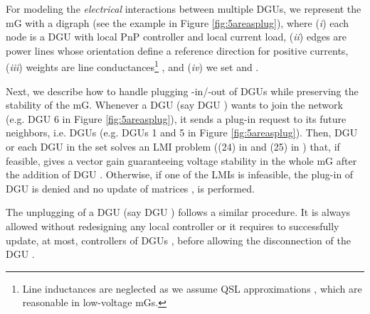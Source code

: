 \documentclass[a4paper]{article}
\theoremstyle{plain}
\begin{document}
For modeling the \textit{electrical} interactions between multiple DGUs, we represent the mG
with a digraph  (see the example in Figure \ref{fig:5areasplug}), where (\textit{i}) each node is a DGU with
local PnP controller and local current load, (\textit{ii}) edges  are
power lines whose orientation define a reference direction for
positive currents, (\textit{iii}) weights are line conductances\footnote{Line inductances  are neglected as we assume QSL approximations \cite{tucci2015decentralized, tucci2016improved}, which are reasonable in low-voltage mGs.} , and
(\textit{iv}) we set  and . 

Next, we describe how to handle plugging -in/-out of DGUs while preserving
the stability of the mG. Whenever a DGU (say DGU ) wants to join
the network (e.g. DGU 6 in Figure \ref{fig:5areasplug}), it sends a
plug-in request to its future neighbors, i.e. DGUs 
(e.g. DGUs 1 and 5 in Figure \ref{fig:5areasplug}). Then, DGU  \cite{tucci2016improved} or each DGU in
the set  \cite{tucci2015decentralized} solves an LMI problem ((24) in
\cite{tucci2016improved} and (25) in \cite{tucci2015decentralized}) that, if feasible, gives a vector gain
 guaranteeing voltage stability in the whole mG after the
addition of DGU . Otherwise, if one of the LMIs is infeasible, the
plug-in of DGU  is denied and no update of matrices ,
 is performed. 

The unplugging of a DGU (say DGU ) follows a similar procedure. It is always allowed without redesigning any local controller \cite{tucci2016improved} or it requires to successfully update, at most, controllers of DGUs ,  before allowing the disconnection of the DGU \cite{tucci2015decentralized}. 
\end{document}
